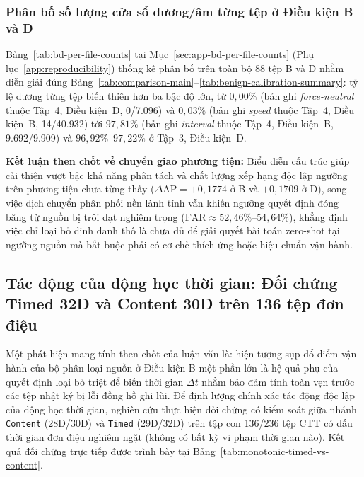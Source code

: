\documentclass[12pt, a4paper, reqno, oneside]{book}
\DeclareRobustCommand{\code}[1]{\nolinkurl{#1}}
\begin{document}
\subsubsection{Phân bố số lượng cửa sổ dương/âm từng tệp ở Điều kiện B và D}\label{subsec:bd-per-file-counts}
Bảng~\ref{tab:bd-per-file-counts} tại Mục~\ref{sec:app-bd-per-file-counts} (Phụ lục~\ref{app:reproducibility}) thống kê phân bố trên toàn bộ 88 tệp B và D nhằm diễn giải đúng Bảng~\ref{tab:comparison-main}--\ref{tab:benign-calibration-summary}: tỷ lệ dương từng tệp biến thiên hơn ba bậc độ lớn, từ $0{,}00\%$ (bản ghi \textit{force-neutral} thuộc Tập~4, Điều kiện~D, 0/7.096) và $0{,}03\%$ (bản ghi \textit{speed} thuộc Tập~4, Điều kiện~B, 14/40.932) tới $97{,}81\%$ (bản ghi \textit{interval} thuộc Tập~4, Điều kiện~B, 9.692/9.909) và $96{,}92\%\text{--}97{,}22\%$ ở Tập~3, Điều kiện~D.

\noindent\textbf{Kết luận then chốt về chuyển giao phương tiện:} Biểu diễn cấu trúc giúp cải thiện vượt bậc khả năng phân tách và chất lượng xếp hạng độc lập ngưỡng trên phương tiện chưa từng thấy ($\Delta\text{AP} = +0{,}1774$ ở B và $+0{,}1709$ ở D), song việc dịch chuyển phân phối nền lành tính vẫn khiến ngưỡng quyết định đóng băng từ nguồn bị trôi dạt nghiêm trọng ($\text{FAR} \approx 52{,}46\%\text{--}54{,}64\%$), khẳng định việc chỉ loại bỏ định danh thô là chưa đủ để giải quyết bài toán zero-shot tại ngưỡng nguồn mà bắt buộc phải có cơ chế thích ứng hoặc hiệu chuẩn vận hành.

\subsection{Tác động của động học thời gian: Đối chứng Timed 32D và Content 30D trên 136 tệp đơn điệu}\label{subsec:timed-vs-content}
Một phát hiện mang tính then chốt của luận văn là: hiện tượng sụp đổ điểm vận hành của bộ phân loại nguồn ở Điều kiện B một phần lớn là hệ quả phụ của quyết định loại bỏ triệt để biến thời gian $\Delta t$ nhằm bảo đảm tính toàn vẹn trước các tệp nhật ký bị lỗi đồng hồ ghi lùi. Để định lượng chính xác tác động độc lập của động học thời gian, nghiên cứu thực hiện đối chứng có kiểm soát giữa nhánh \code{Content} (28D/30D) và \code{Timed} (29D/32D) trên tập con 136/236 tệp CTT có dấu thời gian đơn điệu nghiêm ngặt (không có bất kỳ vi phạm thời gian nào). Kết quả đối chứng trực tiếp được trình bày tại Bảng~\ref{tab:monotonic-timed-vs-content}.
\end{document}
